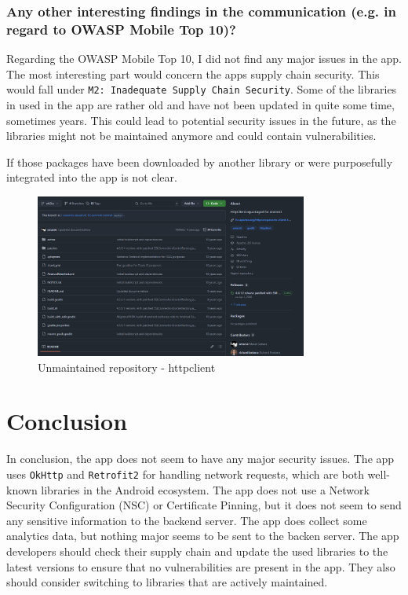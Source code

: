\documentclass[12pt,a4paper]{article}
\begin{document}
\subsubsection{Any other interesting findings in the communication (e.g. in regard to OWASP Mobile Top 10)?}

Regarding the OWASP Mobile Top 10, I did not find any major issues in the app.
The most interesting part would concern the apps supply chain security. This would fall under \texttt{M2: Inadequate Supply Chain Security}. Some of the libraries in used in the app are rather old and 
have not been updated in quite some time, sometimes years. This could lead to potential security issues in the future, as the libraries might not be maintained anymore and could contain vulnerabilities.

If those packages have been downloaded by another library or were purposefully integrated into the app is not clear.

\begin{figure}[H]
\centering
\includegraphics[width=0.8\textwidth]{./screenshots/old_repository.png}
\caption{Unmaintained repository - httpclient}
\end{figure}

\section{Conclusion}

In conclusion, the app does not seem to have any major security issues. The app uses \texttt{OkHttp} and \texttt{Retrofit2} for handling network requests, which are both well-known libraries in the Android ecosystem. 
The app does not use a Network Security Configuration (NSC) or Certificate Pinning, but it does not seem to send any sensitive information to the backend server. 
The app does collect some analytics data, but nothing major seems to be sent to the backen server. The app developers should check their supply chain and update the used libraries to the latest versions to ensure that no vulnerabilities are present in the app.
They also should consider switching to libraries that are actively maintained.
\end{document}
